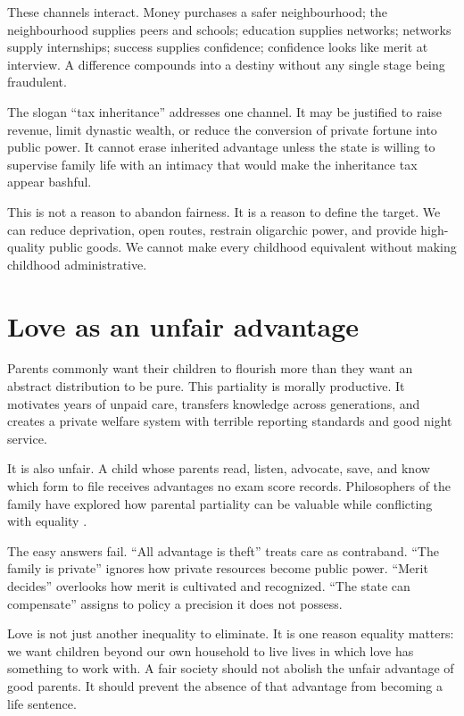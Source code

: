 \documentclass[12pt,a4paper]{book}
\begin{document}
These channels interact.  Money purchases a safer neighbourhood; the
neighbourhood supplies peers and schools; education supplies networks; networks
supply internships; success supplies confidence; confidence looks like merit
at interview.  A difference compounds into a destiny without any single stage
being fraudulent.

The slogan ``tax inheritance'' addresses one channel.  It may be justified to
raise revenue, limit dynastic wealth, or reduce the conversion of private
fortune into public power.  It cannot erase inherited advantage unless the
state is willing to supervise family life with an intimacy that would make the
inheritance tax appear bashful.

This is not a reason to abandon fairness.  It is a reason to define the target.
We can reduce deprivation, open routes, restrain oligarchic power, and provide
high-quality public goods.  We cannot make every childhood equivalent without
making childhood administrative.

\section{Love as an unfair advantage}

Parents commonly want their children to flourish more than they want an
abstract distribution to be pure.  This partiality is morally productive.  It
motivates years of unpaid care, transfers knowledge across generations, and
creates a private welfare system with terrible reporting standards and good
night service.

It is also unfair.  A child whose parents read, listen, advocate, save, and know
which form to file receives advantages no exam score records.  Philosophers of
the family have explored how parental partiality can be valuable while
conflicting with equality \cite{BrighouseSwift2014}.

The easy answers fail.  ``All advantage is theft'' treats care as contraband.
``The family is private'' ignores how private resources become public power.
``Merit decides'' overlooks how merit is cultivated and recognized.  ``The
state can compensate'' assigns to policy a precision it does not possess.

Love is not just another inequality to eliminate.  It is one reason equality
matters: we want children beyond our own household to live lives in which love
has something to work with.  A fair society should not abolish the unfair
advantage of good parents.  It should prevent the absence of that advantage
from becoming a life sentence.
\end{document}
